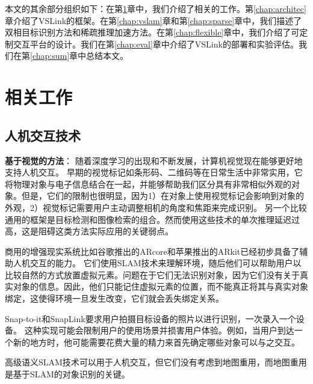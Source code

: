 本文的其余部分组织如下：在第\ref{chap:related}章中，我们介绍了相关的工作。第\ref{chap:architec}章介绍了VSLink的框架。在第\ref{chap:vslam}章和第\ref{chap:sparse}章中，我们描述了双相目标识别方法和稀疏推理加速方法。在第\ref{chap:flexible}章中，我们介绍了可定制交互平台的设计。我们在第\ref{chap:eval}章中介绍了VSLink的部署和实验评估。我们在第\ref{chap:sum}章中总结本文。



\chapter{相关工作}
\label{chap:related}
\section{人机交互技术}

\textbf{基于视觉的方法}：
随着深度学习的出现和不断发展，计算机视觉现在能够更好地支持人机交互。
早期的视觉标记\cite{wang2010design,olson2011apriltag}如条形码、二维码等在日常生活中非常实用，它将物理对象与电子信息结合在一起，并能够帮助我们区分具有非常相似外观的对象。但是，它们的限制也很明显，因为1）在对象上使用视觉标记会影响到对象的外观，2）视觉标记需要用户主动调整相机的角度和焦距来完成识别。
另一个比较通用的框架是目标检测\cite{ren2015faster,redmon2018yolov3,qin2019thundernet}和图像检索\cite{philbin2008lost,zheng2017sift}的组合。然而使用这些技术的单次推理延迟过高，这是阻碍这类方法实际应用的关键弱点。

商用的增强现实系统比如谷歌推出的ARcore\cite{arcore}和苹果推出的ARkit\cite{arkit}已经初步具备了辅助人机交互的能力。
它们使用SLAM技术来理解环境，随后他们可以帮助用户以比较自然的方式放置虚拟元素。问题在于它们无法识别对象，因为它们没有关于真实对象的信息。因此，他们只能记住虚拟元素的位置，而不能真正将其与真实对象绑定，这使得环境一旦发生改变，它们就会丢失绑定关系。

Snap-to-it\cite{de2016snap}和SnapLink\cite{chen2018snaplink}要求用户拍摄目标设备的照片以进行识别，一次录入一个设备。
这种实现可能会限制用户的使用场景并损害用户体验。例如，当用户到达一个新的地方时，他可能需要花费大量的精力来首先确定哪些对象可以与之交互。

高级语义SLAM技术\cite{strecke2019fusion,runz2018maskfusion,salas2013slam++}可以用于人机交互，但它们没有考虑到地图重用，而地图重用是基于SLAM的对象识别的关键。


